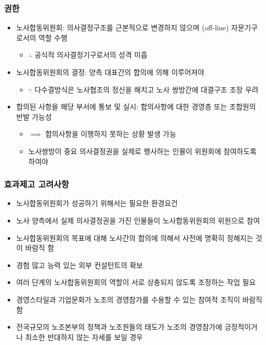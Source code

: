 \documentclass[aspectratio=169,xcolor=dvipsnames,handout]{beamer}
\begin{document}
\begin{frame}
    \frametitle{권한}
    \begin{itemize}[<+->]
        \item 노사합동위원회: 의사결정구조를 근본적으로 변경하지 않으며 (off-line) 자문기구로서의 역할 수행
        \begin{itemize}[<+->]
            \item $\therefore$ 공식적 의사결정기구로서의 성격 미흡
        \end{itemize}
        \item 노사합동위원회의 결정: 양측 대표간의 합의에 의해 이루어져야
        \begin{itemize}[<+->]
            \item $\because$ 다수결방식은 노사협조의 정신을 해치고 노사 쌍방간에 대결구조 조장 우려
        \end{itemize}
        \item 합의된 사항을 해당 부서에 통보 및 실시: 합의사항에 대한 경영층 또는 조합원의 반발 가능성
        \begin{itemize}[<+->]
            \item $\implies$ 합의사항을 이행하지 못하는 상황 발생 가능
            \item 노사쌍방이 중요 의사결정권을 실제로 행사하는 인물이 위원회에 참여하도록 하여야
        \end{itemize}
    \end{itemize}
\end{frame}

\begin{frame}
    \frametitle{효과제고 고려사항}
    \begin{itemize}[<+->]
        \item 노사합동위원회가 성공하기 위해서는 필요한 환경요건
        \item 노사 양측에서 실제 의사결정권을 가진 인물들이 노사합동위원회의 위원으로 참여
        \item 노사합동위원회의 목표에 대해 노사간의 합의에 의해서 사전에 명확히 정해지는 것이 바람직 함
        \item 경험 많고 능력 있는 외부 컨설턴트의 확보
        \item 여러 단계의 노사합동위원회의 역할이 서로 상충되지 않도록 조정하는 작업 필요
        \item 경영스타일과 기업문화가 노조의 경영참가를 수용할 수 있는 참여적 조직이 바람직 함
        \item 전국규모의 노조본부의 정책과 노조원들의 태도가 노조의 경영참가에 긍정적이거나 최소한 반대하지 않는 자세를 보일 경우
    \end{itemize}
\end{frame}
\end{document}
